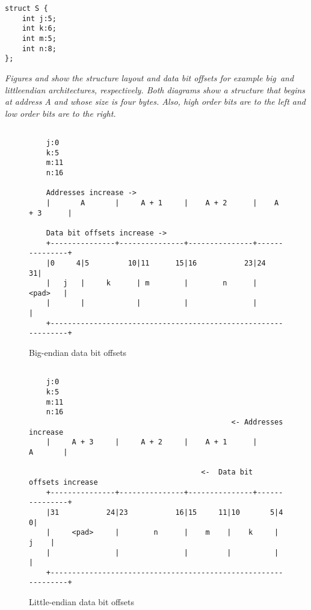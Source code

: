 \begin{lstlisting}
struct S {
    int j:5;
    int k:6;
    int m:5;
    int n:8;
};
\end{lstlisting}

\textit{Figures  and
show the structure layout
and data bit offsets for example big\dash\   and little\dash endian
architectures, respectively. Both diagrams show a structure
that begins at address A and whose size is four bytes. Also,
high order bits are to the left and low order bits are to
the right.}

\begin{figure}[h]
\begin{dwflisting}
\begin{verbatim}

    j:0
    k:5
    m:11
    n:16

    Addresses increase ->
    |       A       |     A + 1     |    A + 2      |    A + 3      | 

    Data bit offsets increase ->
    +---------------+---------------+---------------+---------------+
    |0     4|5         10|11      15|16           23|24           31|
    |   j   |     k      | m        |        n      |       <pad>   |
    |       |            |          |               |               | 
    +---------------------------------------------------------------+ 

\end{verbatim}
\end{dwflisting}
\caption{Big-endian data bit offsets}
\label{fig:bigendiandatabitoffsets}
\end{figure}

\begin{figure}[h]
\begin{dwflisting}
\begin{verbatim}

    j:0
    k:5
    m:11
    n:16
                                               <- Addresses increase
    |     A + 3     |     A + 2     |    A + 1      |       A       | 

                                        <-  Data bit offsets increase 
    +---------------+---------------+---------------+---------------+
    |31           24|23           16|15     11|10       5|4        0|
    |     <pad>     |        n      |    m    |    k     |     j    |
    |               |               |         |          |          |
    +---------------------------------------------------------------+

\end{verbatim}
\end{dwflisting}
\caption{Little-endian data bit offsets}
\label{fig:littleendiandatabitoffsets}
\end{figure}

